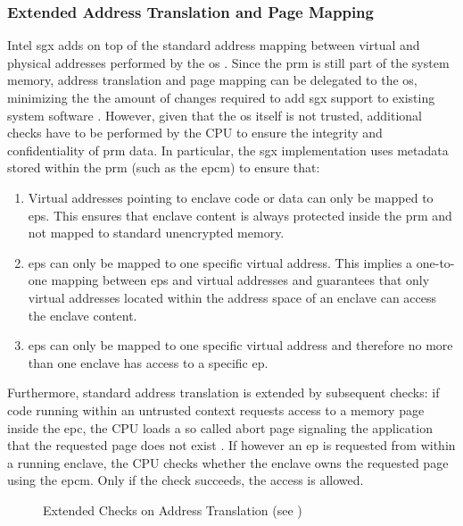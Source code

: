 \subsubsection{Extended Address Translation and Page Mapping}
\label{sec:AddressTranslation}
Intel \ac{sgx} adds  on top of the standard address mapping between virtual and physical addresses performed by the \ac{os} \cite{Costan2016IntelSE}. Since the \ac{prm} is still part of the 
system memory, address translation and page mapping can be delegated to the \ac{os}, minimizing the the amount of changes required to add \ac{sgx} support to existing system software 
\cite{IntelSGXSSLab}. However, given that the \ac{os} itself is not trusted, additional checks have to be performed by the CPU to ensure the integrity and confidentiality of \ac{prm} 
data. In particular, the \ac{sgx} implementation uses metadata stored within the \ac{prm} (such as the \ac{epcm}) to ensure that:
\begin{enumerate}
    \item Virtual addresses pointing to enclave code or data can only be mapped to \acp{ep}. This ensures that enclave content is always protected inside the \ac{prm} and not mapped to
          standard unencrypted memory.
    \item \acp{ep} can only be mapped to one specific virtual address. This implies a one-to-one mapping between \acp{ep} and virtual addresses and guarantees that only virtual addresses
          located within the address space of an enclave can access the enclave content.
    \item \acp{ep} can only be mapped to one specific virtual address and therefore no more than one enclave has access to a specific \ac{ep}.
\end{enumerate}
Furthermore, standard address translation is extended by subsequent checks: if code running within an untrusted context requests access to a memory page inside the \ac{epc},
the CPU loads a so called abort page signaling the application that the requested page does not exist \cite{Costan2016IntelSE}. If however an \ac{ep} is requested from within a
running enclave, the CPU checks whether the enclave owns the requested page using the \ac{epcm}. Only if the check succeeds, the access is allowed.

\begin{figure}[h!]
    \centering
    \caption{Extended Checks on Address Translation (see \cite{IntelSGXExplanation})}
    \label{fig:pageCheck}
\end{figure}
